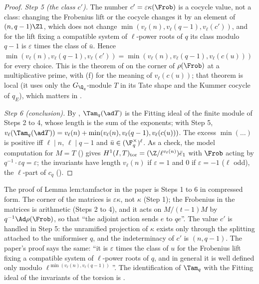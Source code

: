 \begin{proof}
\emph{Step 5 (the class $c'$).} The number $c'=\varepsilon\kappa(\Frob)$ is a cocycle value, not a class: changing the Frobenius lift or the cocycle changes it by an element
of $(n,q-1)\Zl$, which does not change $\min(v_\ell(n),v_\ell(q-1),v_\ell(c'))$, and for the lift fixing a compatible system of $\ell$-power roots of $q$ its class modulo $q-1$
is $\varepsilon$ times the class of $\bar u$. Hence $\min(v_\ell(n),v_\ell(q-1),v_\ell(c'))=\min(v_\ell(n),v_\ell(q-1),v_\ell(c(u)))$ for every choice. This is the theorem of
 on the corner of $\rho(\Frob)$ at a multiplicative prime, with (f) for the meaning of $v_\ell(c(u))$; that theorem is local (it uses
only the $G_{\Q_q}$-module $T$ in its Tate shape and the Kummer cocycle of $q_E$), which matters in .

\emph{Step 6 (conclusion).} By , $\Tam_q(\ad T)$ is the Fitting ideal of the finite module of Steps 2 to 4, whose length is the sum of the
exponents; with Step 5, $v_\ell(\Tam_q(\ad T))=v_\ell(n)+\min(v_\ell(n),v_\ell(q-1),v_\ell(c(u)))$. The excess $\min(\dots)$ is positive iff $\ell\mid n$, $\ell\mid q-1$ and
$\bar u\in(\F_q^\times)^\ell$. As a check, the model computation for $M=T$ () gives $H^1(I,T)_{\mathrm{tor}}=(\Z/\ell^{v_\ell(n)})\bar e_1$ with $\Frob$ acting by
$q^{-1}\cdot\varepsilon q=\varepsilon$; the invariants have length $v_\ell(n)$ if $\varepsilon=1$ and $0$ if $\varepsilon=-1$ ($\ell$ odd), the $\ell$-part of $c_q$ ().
\end{proof}

\begin{paperlink}
The proof of Lemma lem:tamfactor in the paper is Steps 1 to 6 in compressed form. The corner of the matrices is $\varepsilon\kappa$, not $\kappa$ (Step 1); the Frobenius
in the matrices is arithmetic (Steps 2 to 4), and it acts on $M/(t-1)M$ by $q^{-1}\Ad\rho(\Frob)$, so that ``the adjoint action sends $e$ to $qe$''. The value $c'$ is
handled in Step 5: the unramified projection of $\kappa$ exists only through the splitting attached to the uniformiser $q$, and the indeterminacy of $c'$ is $(n,q-1)$.
The paper's proof says the same: ``it is $\varepsilon$ times the class of $u$ for the Frobenius lift fixing a compatible system of $\ell$-power roots of $q$, and in
general it is well defined only modulo $\ell^{\min(v_\ell(n),v_\ell(q-1))}$''. The identification of $\Tam_q$ with the Fitting ideal of the
invariants of the torsion is .
\end{paperlink}

